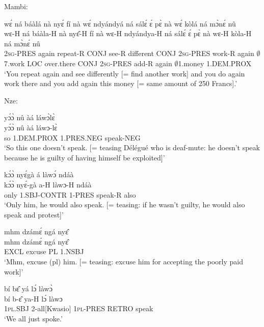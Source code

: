\noindent Mambi:

\begin{exe} 
\exC\label{247} 
  \glll wɛ́ ná báàlá nà nyɛ́ fí nà wɛ́ ndyándyá ná sálɛ́ ɛ́ pɛ̀ nà wɛ́ kòlá ná mɔ̀nɛ́ nû \\
      wɛ-H ná báàla-H nà nyɛ̂-H fí nà wɛ-H ndyándya-H ná sálɛ́ ɛ́ pɛ̀ nà wɛ-H kòla-H ná mɔ̀nɛ́ nû \\
         2\textsc{sg}-PRES again repeat-R CONJ see-R different CONJ 2\textsc{sg}-PRES work-R again $\emptyset$7.work LOC over.there CONJ 2\textsc{sg}-PRES add-R again $\emptyset$1.money 1.DEM.PROX \\
    \trans `You repeat again and see differently [= find another work] and you do again work there and you add again this money [= same amount of 250 Francs].'
\end{exe}

\noindent Nze:

\begin{exe} 
\exC\label{248} 
  \glll yɔ́ɔ̀ nû àá láwɔ̀lɛ̀\\
       yɔ́ɔ̀ nû àá láwɔ-lɛ̀ \\
         so 1.DEM.PROX 1.PRES.NEG speak-NEG \\
    \trans `So this one doesn't speak. [= teasing Délégué who is deaf-mute: he doesn't speak because he is guilty of having himself be exploited]'
\end{exe}

\begin{exe} 
\exC\label{249}
  \glll  kɔ́ɔ̀ nyɛ́gà á làwɔ́ ndáà\\
         kɔ́ɔ̀ nyɛ́-gà a-H làwɔ-H ndáà \\
         only  1.SBJ-CONTR 1-PRES speak-R also \\
    \trans `Only him, he would also speak. [= teasing: if he wasn't guilty, he would also speak and protest]'
\end{exe}

\begin{exe} 
\exC\label{250} 
  \glll  mhm dzámɛ́ ngá nyɛ̂ \\
       mhm dzámɛ́ ngá nyɛ̂ \\
         EXCL excuse PL 1.NSBJ \\
    \trans `Mhm, excuse (pl) him. [= teasing: excuse him for accepting the poorly paid work]'
\end{exe}

\begin{exe} 
\exC\label{251}
  \glll bí bɛ̂ yá lɔ́ làwɔ̀ \\
      bí b-ɛ̂ ya-H lɔ́ làwɔ \\
        1\textsc{pl}.SBJ 2-all[Kwasio] 1\textsc{pl}-PRES RETRO speak \\
    \trans `We all just spoke.'
\end{exe}

